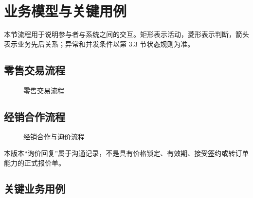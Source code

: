 \section{业务模型与关键用例}\label{sec:4-业务模型与关键用例}

本节流程用于说明参与者与系统之间的交互。矩形表示活动，菱形表示判断，箭头表示业务先后关系；异常和并发条件以第 3.3 节状态规则为准。

\subsection{零售交易流程}\label{sec:41-零售交易流程}

\begin{figure}[H]
\centering

\caption{零售交易流程}
\label{fig:retail-flow}
\end{figure}

\subsection{经销合作流程}\label{sec:42-经销合作流程}

\begin{figure}[H]
\centering

\caption{经销合作与询价流程}
\label{fig:dealer-flow}
\end{figure}

本版本“询价回复”属于沟通记录，不是具有价格锁定、有效期、接受签约或转订单能力的正式报价单。

\subsection{关键业务用例}\label{sec:43-关键业务用例}



